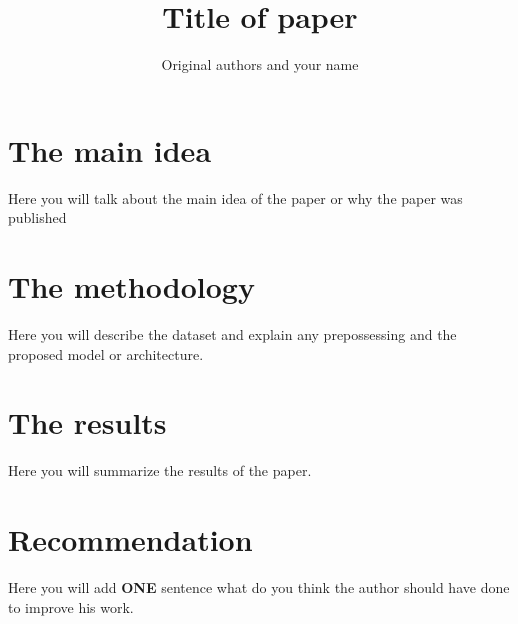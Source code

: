 \documentclass[a4paper]{article}
\title{Title of paper}
\author[1]{Original authors and your name}
\begin{document}
\maketitle
\section{The main idea}

Here you will talk about the main idea of the paper or why the paper was published 

\section{The methodology }

Here you will describe the dataset and explain any prepossessing and the proposed model or architecture.

\section{The results}
 
Here you will summarize the results of the paper. 

\section{Recommendation}

Here you will add \textbf{ONE} sentence what do you think the author should have done to improve his work. 
\end{document}
